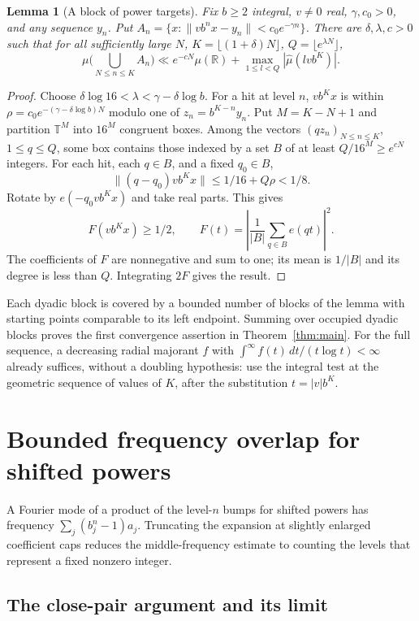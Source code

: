 \documentclass[11pt,a4paper,reqno]{amsart}
\newtheorem{lemma}[theorem]{Lemma}
\theoremstyle{definition}
\theoremstyle{remark}
\numberwithin{equation}{section}
\begin{document}
\begin{lemma}[A block of power targets]\label{lem:block}
Fix \(b\ge2\) integral, \(v\ne0\) real, \(\gamma,c_0>0\), and any
sequence \(y_n\). Put \(A_n=\{x:\|vb^n x-y_n\|<c_0e^{-\gamma n}\}\).
There are \(\delta,\lambda,c>0\) such that for all sufficiently large
\(N\), \(K=\lfloor(1+\delta)N\rfloor\), \(Q=\lfloor e^{\lambda N}\rfloor\),
\[
 \mu\Big(\bigcup_{N\le n\le K} A_n\Big)
 \ll e^{-cN}\mu(\mathbb R)+
     \max_{1\le l<Q}|\widehat\mu(lvb^K)|.
\]
\end{lemma}
\begin{proof}
Choose \(\delta\log16<\lambda<\gamma-\delta\log b\). For a hit at
level \(n\), \(vb^Kx\) is within
\(\rho=c_0 e^{-(\gamma-\delta\log b)N}\) modulo one of
\(z_n=b^{K-n}y_n\). Put \(M=K-N+1\) and partition \(\mathbb T^M\)
into \(16^M\) congruent boxes. Among the vectors
\((qz_n)_{N\le n\le K}\), \(1\le q\le Q\), some box contains those
indexed by a set \(B\) of at least \(Q/16^M\ge e^{cN}\) integers.
For each hit, each \(q\in B\), and a fixed \(q_0\in B\),
\[
     \|(q-q_0)vb^Kx\|\le 1/16+Q\rho<1/8 .
\]
Rotate by \(e(-q_0vb^Kx)\) and take real parts. This gives
\[
 F(vb^Kx)\ge1/2,\qquad F(t)=\left|\frac1{|B|}\sum_{q\in B}e(qt)\right|^2 .
\]
The coefficients of \(F\) are nonnegative and sum to one; its mean
is \(1/|B|\) and its degree is less than \(Q\). Integrating \(2F\)
gives the result.
\end{proof}
Each dyadic block is covered by a bounded number of blocks of the
lemma with starting points comparable to its left endpoint.
Summing over occupied dyadic blocks proves the first convergence
assertion in Theorem~\ref{thm:main}. For the full sequence, a
decreasing radial majorant \(f\) with
\(\int^\infty f(t)\,dt/(t\log t)<\infty\) already suffices, without a
doubling hypothesis: use the integral test at the geometric sequence
of values of \(K\), after the substitution \(t=|v|b^K\).

\section{Bounded frequency overlap for shifted powers}\label{sec:overlap}

A Fourier mode of a product of the level-\(n\) bumps for shifted
powers has frequency \(\sum_j(b_j^n-1)a_j\). Truncating the expansion
at slightly enlarged coefficient caps reduces the middle-frequency
estimate to counting the levels that represent a fixed nonzero
integer.

\subsection{The close-pair argument and its limit}
\end{document}
